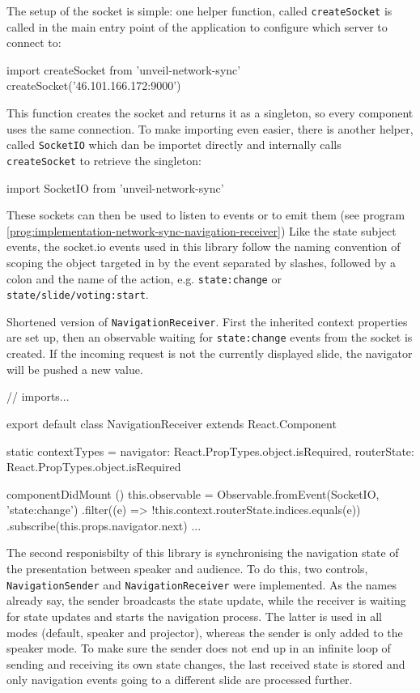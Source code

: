 The setup of the socket is simple: one helper function, called \texttt{createSocket} is called in the main entry point of the application to configure which server to connect to:
%
\begin{JsCode}
import { createSocket } from 'unveil-network-sync'
createSocket('46.101.166.172:9000')
\end{JsCode}
%
This function creates the socket and returns it as a singleton, so every component uses the same connection. To make importing even easier, there is another helper, called \texttt{SocketIO} which dan be importet directly and internally calls \texttt{createSocket} to retrieve the singleton:
%
\begin{JsCode}
import { SocketIO } from 'unveil-network-sync'
\end{JsCode}
%

These sockets can then be used to listen to events or to emit them (see program \ref{prog:implementation-network-sync-navigation-receiver}) Like the state subject events, the socket.io events used in this library follow the naming convention of scoping the object targeted in by the event separated by slashes, followed by a colon and the name of the action, e.g. \texttt{state:change} or \texttt{state/slide/voting:start}.

\begin{program}
\caption{Shortened version of \texttt{NavigationReceiver}. First the inherited context properties are set up, then an observable waiting for \texttt{state:change} events from the socket is created. If the incoming request is not the currently displayed slide, the navigator will be pushed a new value.}
\label{prog:implementation-network-sync-navigation-receiver}
\begin{JsCode}
// imports...

export default class NavigationReceiver extends React.Component {
  static contextTypes = {
    navigator:   React.PropTypes.object.isRequired,
    routerState: React.PropTypes.object.isRequired
  }

  componentDidMount () {
    this.observable = Observable.fromEvent(SocketIO, 'state:change')
      .filter((e) => !this.context.routerState.indices.equals(e))
      .subscribe(this.props.navigator.next)
  }
  ...
}
\end{JsCode}
\end{program}
%
The second responisbilty of this library is synchronising the navigation state of the presentation between speaker and audience. To do this, two controls, \texttt{NavigationSender} and \texttt{NavigationReceiver} were implemented. As the names already say, the sender broadcasts the state update, while the receiver is waiting for state updates and starts the navigation process. The latter is used in all modes (default, speaker and projector), whereas the sender is only added to the speaker mode. To make sure the sender does not end up in an infinite loop of sending and receiving its own state changes, the last received state is stored and only navigation events going to a different slide are processed further.

